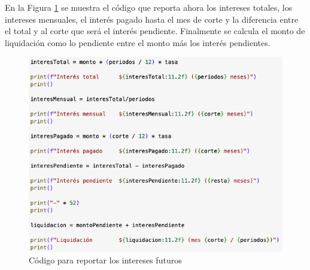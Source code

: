 \documentclass{article}
\begin{document}
\break
\noindent
En la Figura \ref{fig:s110-2} se muestra el código que reporta ahora los intereses totales, los intereses mensuales, el interés pagado hasta el mes de corte y la diferencia entre el total y al corte que será el interés pendiente. Finalmente se calcula el monto de liquidación como lo pendiente entre el monto más los interés pendientes.
\begin{figure}[!ht]
    \centering
    \begin{minipage}{\textwidth}
        \centering
        \includegraphics[width=\textwidth]{figures/s110-2.png}
    \end{minipage}
    \captionsetup{width=0.9\textwidth}
    \caption{Código para reportar los intereses futuros}
    \label{fig:s110-2}
\end{figure}
\end{document}
